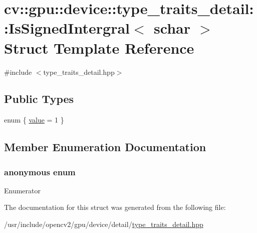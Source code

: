 \hypertarget{structcv_1_1gpu_1_1device_1_1type__traits__detail_1_1IsSignedIntergral_3_01schar_01_4}{\section{cv\-:\-:gpu\-:\-:device\-:\-:type\-\_\-traits\-\_\-detail\-:\-:Is\-Signed\-Intergral$<$ schar $>$ Struct Template Reference}
\label{structcv_1_1gpu_1_1device_1_1type__traits__detail_1_1IsSignedIntergral_3_01schar_01_4}
}


{\ttfamily \#include $<$type\-\_\-traits\-\_\-detail.\-hpp$>$}

\subsection*{Public Types}
\begin{DoxyCompactItemize}
\item 
enum \{ \hyperlink{structcv_1_1gpu_1_1device_1_1type__traits__detail_1_1IsSignedIntergral_3_01schar_01_4_a194d39d8258b9b3f9b3e15aad2a53a0ca71d582df7a307d5d5a4d951410dfbed4}{value} = 1
 \}
\end{DoxyCompactItemize}


\subsection{Member Enumeration Documentation}
\hypertarget{structcv_1_1gpu_1_1device_1_1type__traits__detail_1_1IsSignedIntergral_3_01schar_01_4_a194d39d8258b9b3f9b3e15aad2a53a0c}{\subsubsection[{anonymous enum}]{\setlength{\rightskip}{0pt plus 5cm}anonymous enum}}\label{structcv_1_1gpu_1_1device_1_1type__traits__detail_1_1IsSignedIntergral_3_01schar_01_4_a194d39d8258b9b3f9b3e15aad2a53a0c}
\begin{Desc}
\item[Enumerator]\par
\begin{description}
\item[{\em 
\hypertarget{structcv_1_1gpu_1_1device_1_1type__traits__detail_1_1IsSignedIntergral_3_01schar_01_4_a194d39d8258b9b3f9b3e15aad2a53a0ca71d582df7a307d5d5a4d951410dfbed4}{value}\label{structcv_1_1gpu_1_1device_1_1type__traits__detail_1_1IsSignedIntergral_3_01schar_01_4_a194d39d8258b9b3f9b3e15aad2a53a0ca71d582df7a307d5d5a4d951410dfbed4}
}]\end{description}
\end{Desc}


The documentation for this struct was generated from the following file\-:\begin{DoxyCompactItemize}
\item 
/usr/include/opencv2/gpu/device/detail/\hyperlink{type__traits__detail_8hpp}{type\-\_\-traits\-\_\-detail.\-hpp}\end{DoxyCompactItemize}

